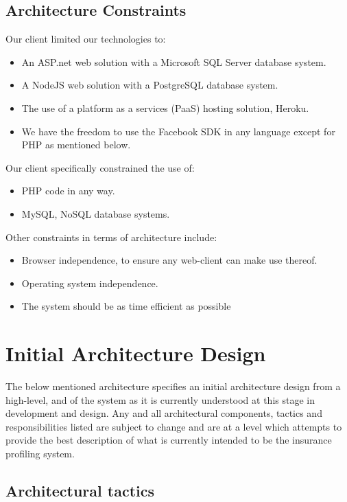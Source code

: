 \documentclass{article}
\begin{document}
	\subsection{Architecture Constraints}
	Our client limited our technologies to:
	\begin{itemize}
		\item An ASP.net web solution with a Microsoft SQL Server database system.
		\item A NodeJS web solution with a PostgreSQL database system.
		\item The use of a platform as a services (PaaS) hosting solution, Heroku.
		\item We have the freedom to use the Facebook SDK in any language except for PHP as mentioned below.
	\end{itemize}
	Our client specifically constrained the use of:
		\begin{itemize}
		\item PHP code in any way.
		\item MySQL, NoSQL database systems.
		\end{itemize}
	Other constraints in terms of architecture include:
	\begin{itemize}
		\item Browser independence, to ensure any web-client can make use thereof.
		\item Operating system independence.
		\item The system should be as time efficient as possible
		\end{itemize}
\pagebreak

	\section{Initial Architecture Design}

	The below mentioned architecture specifies an initial architecture design from a high-level, and of the system as it is currently understood at this stage in development and design. Any and all architectural components, tactics and responsibilities listed are subject to change and are at a level which attempts to provide the best description of what is currently intended to be the insurance profiling system.

	\subsection{Architectural tactics}\label{subsec:tactics}
\end{document}
